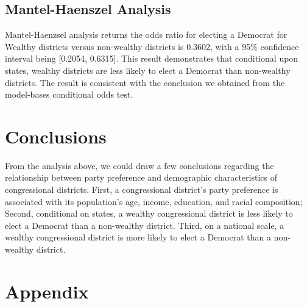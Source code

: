\documentclass[12pt,a4paper]{article}
\begin{document}
\subsection{Mantel-Haenszel Analysis}

Mantel-Haenzsel analysis returns the odds ratio for electing a Democrat for Wealthy districts versus non-wealthy districts is 0.3602, with a 95\% confidence interval being [0.2054, 0.6315]. This result demonstrates that conditional upon states, wealthy districts are less likely to elect a Democrat than non-wealthy districts. The result is consistent with the conclusion we obtained from the model-bases conditional odds test.

\section{Conclusions}

From the analysis above, we could draw a few conclusions regarding the relationship between party preference and demographic characteristics of congressional districts. First, a congressional district's party preference is associated with its population's age, income, education, and racial composition; Second, conditional on states, a wealthy congressional district is less likely to elect a Democrat than a non-wealthy district. Third, on a national scale, a wealthy congressional district is more likely to elect a Democrat than a non-wealthy district.

\section{Appendix}
\end{document}
